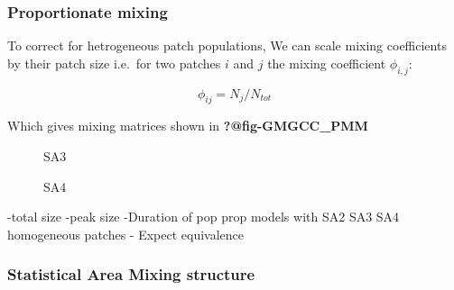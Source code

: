 \documentclass[
  letterpaper,
  DIV=11,
  numbers=noendperiod]{scrartcl}
\begin{document}
\hypertarget{sec-propmix}{%
\subsubsection{Proportionate mixing}\label{sec-propmix}}

To correct for hetrogeneous patch populations, We can scale mixing
coefficients by their patch size i.e.~for two patches \(i\) and \(j\)
the mixing coefficient \(\phi_{i,j}\):

\[
\phi_{ij} = N_j/N_{tot}
\]

Which gives mixing matrices shown in \textbf{?@fig-GMGCC\_PMM}

\begin{figure}

\begin{minipage}[t]{0.50\linewidth}

{\centering 


\caption{\label{fig-GMelb_PPM-1}SA3}

}

\end{minipage}%
%
\begin{minipage}[t]{0.50\linewidth}

{\centering 


\caption{\label{fig-GMelb_PPM-2}SA4}

}

\end{minipage}%

\end{figure}

-total size -peak size -Duration of pop prop models with SA2 SA3 SA4
homogeneous patches - Expect equivalence

\hypertarget{sec-SAmixmat}{%
\subsubsection{Statistical Area Mixing structure}\label{sec-SAmixmat}}
\end{document}
